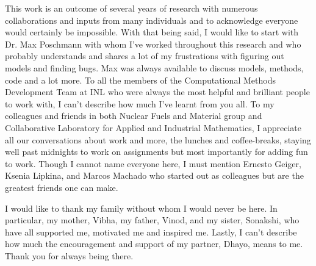 This work is an outcome of several years of research with numerous collaborations and inputs from many individuals and to acknowledge everyone would certainly be impossible. With that being said, I would like to start with Dr. Max Poschmann with whom I've worked throughout this research and who probably understands and shares a lot of my frustrations with figuring out models and finding bugs. Max was always available to discuss models, methods, code and a lot more. To all the members of the Computational Methods Development Team at INL who were always the most helpful and brilliant people to work with, I can't describe how much I've learnt from you all. To my colleagues and friends in both Nuclear Fuels and Material group and Collaborative Laboratory for Applied and Industrial Mathematics, I appreciate all our conversations about work and more, the lunches and coffee-breaks, staying well past midnights to work on assignments but most importantly for adding fun to work. Though I cannot name everyone here, I must mention Ernesto Geiger, Ksenia Lipkina, and Marcos Machado who started out as colleagues but are the greatest friends one can make.

I would like to thank my family without whom I would never be here. In particular, my mother, Vibha, my father, Vinod, and my sister, Sonakshi, who have all supported me, motivated me and inspired me. Lastly, I can't describe how much the encouragement and support of my partner, Dhayo, means to me. Thank you for always being there.


